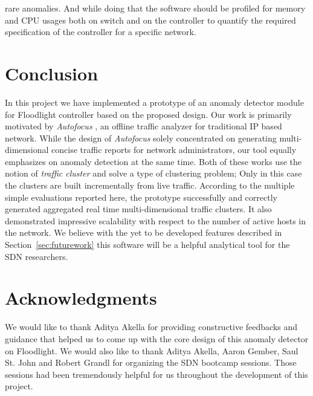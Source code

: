 \documentclass[twocolumn]{article}
\begin{document}
rare anomalies. And while doing that the software should be profiled for memory and CPU usages both on switch and on the controller to quantify the required specification of the controller for a specific network.



\section{Conclusion}
\label{sec:summary}
In this project we have implemented a prototype of an anomaly detector module for Floodlight controller based on the proposed design. Our work is primarily motivated by \emph{Autofocus} \cite{autofocus}, an offline traffic analyzer for traditional IP based network. While the design of \emph{Autofocus} solely concentrated on generating multi-dimensional concise traffic reports for network administrators, our tool equally emphasizes on anomaly detection at the same time. Both of these works use the notion of \emph{traffic cluster} and solve a type of clustering problem; Only in this case the clusters are built incrementally from live traffic. According to the multiple simple evaluations reported here, the prototype successfully and correctly generated aggregated real time multi-dimensional traffic clusters. It also demonstrated impressive scalability with respect to the number of active hosts in the network. We believe with the yet to be developed features described in Section~\ref{sec:futurework} this software will be a helpful analytical tool for the SDN researchers. 

\section{Acknowledgments}
We would like to thank Aditya Akella for providing constructive feedbacks and guidance that helped us to come up with the core design of this anomaly detector on Floodlight. We would also like to thank Aditya Akella, Aaron Gember, Saul St. John and Robert Grandl for organizing the SDN bootcamp sessions. Those sessions had been tremendously helpful for us throughout the development of this project. 


\label{references}

\end{document}
